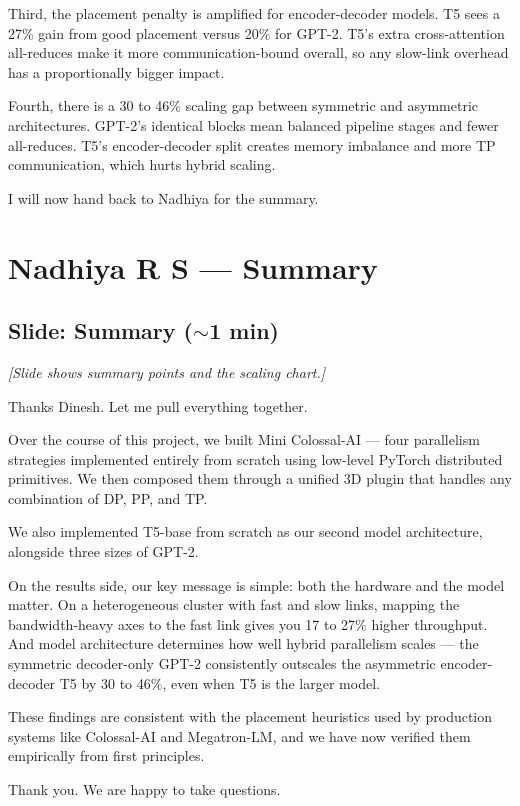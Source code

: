 \documentclass[11pt, a4paper]{article}
\begin{document}
Third, the placement penalty is amplified for encoder-decoder models. T5 sees a 27\% gain from good placement versus 20\% for GPT-2. T5's extra cross-attention all-reduces make it more communication-bound overall, so any slow-link overhead has a proportionally bigger impact.

Fourth, there is a 30 to 46\% scaling gap between symmetric and asymmetric architectures. GPT-2's identical blocks mean balanced pipeline stages and fewer all-reduces. T5's encoder-decoder split creates memory imbalance and more TP communication, which hurts hybrid scaling.

I will now hand back to Nadhiya for the summary.

\section{Nadhiya R S --- Summary}

\subsection{Slide: Summary ($\sim$1 min)}
\textit{[Slide shows summary points and the scaling chart.]}

Thanks Dinesh. Let me pull everything together.

Over the course of this project, we built Mini Colossal-AI --- four parallelism strategies implemented entirely from scratch using low-level PyTorch distributed primitives. We then composed them through a unified 3D plugin that handles any combination of DP, PP, and TP.

We also implemented T5-base from scratch as our second model architecture, alongside three sizes of GPT-2.

On the results side, our key message is simple: both the hardware and the model matter. On a heterogeneous cluster with fast and slow links, mapping the bandwidth-heavy axes to the fast link gives you 17 to 27\% higher throughput. And model architecture determines how well hybrid parallelism scales --- the symmetric decoder-only GPT-2 consistently outscales the asymmetric encoder-decoder T5 by 30 to 46\%, even when T5 is the larger model.

These findings are consistent with the placement heuristics used by production systems like Colossal-AI and Megatron-LM, and we have now verified them empirically from first principles.

Thank you. We are happy to take questions.
\end{document}
